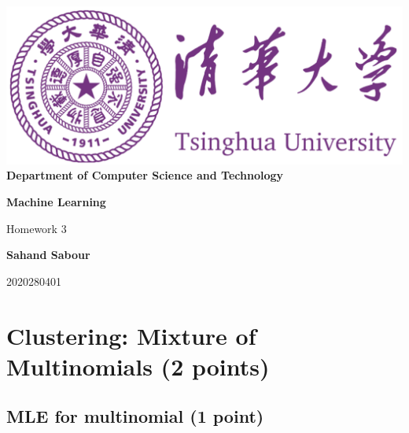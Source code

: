 \documentclass[12pt,a4paper]{article}
\begin{document}
	\begin{titlepage}
		\begin{center}
			\includegraphics[scale=.4]{Figures/Cover}\\
			\vspace{1cm}
			\bf{ \large {Department of Computer Science and Technology} }
		\end{center}
		
		\vspace{4cm}
		\centering
		\textbf{\Huge Machine Learning}
		\vspace{.5cm}
		
		{\Large Homework 3}

		\vspace{4cm}
		
		\textbf{\LARGE Sahand Sabour}
		
		
		
		\vspace{0.5cm}
		
		{\large 2020280401}
		
		
		\vfill
		
	\end{titlepage}


	\section{Clustering: Mixture of Multinomials (2 points)}
	\subsection{MLE for multinomial (1 point)}
	
\end{document}
